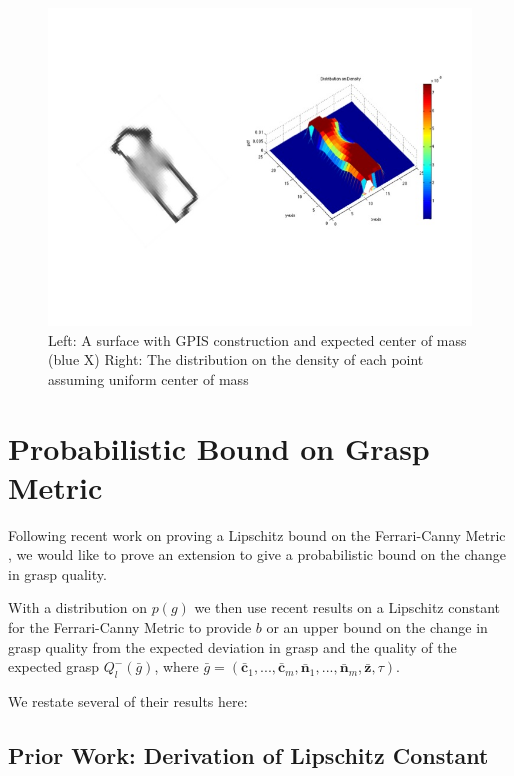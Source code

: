 \documentclass[letterpaper, 10 pt, conference]{ieeeconf}  %
\begin{document}
\begin{figure}[ht!]
\centering
\includegraphics[scale = 0.3]{figures/Slide06.jpg}
\caption{Left: A surface with GPIS construction and expected center of mass (blue X)
Right: The distribution on the density of each point assuming uniform center of mass}
\vspace*{-10pt}
\label{fig:GPIS_MASS}
\end{figure}

\section{Probabilistic Bound on Grasp Metric}
\label{sec:bound}
Following recent work on proving a Lipschitz bound on the Ferrari-Canny Metric \cite{pokorny2013classical}, we would like to prove an extension to give a probabilistic bound on the change in grasp quality.

With a distribution on $p(g)$ we then use recent results on a Lipschitz constant for the Ferrari-Canny Metric \cite{pokorny2013classical} to provide $b$ or an upper bound on the change in grasp quality from the expected deviation in grasp and the quality of the expected grasp $Q_l^-(\bar{g})$, where $\bar{g} = ( \bar{\textbf{c}}_1,...,\bar{\textbf{c}}_m,\bar{\textbf{n}}_1,...,\bar{\textbf{n}}_m,\bar{\textbf{z}},\tau )$.

We restate several of their results here:

\subsection{Prior Work: Derivation of Lipschitz Constant }
\end{document}
